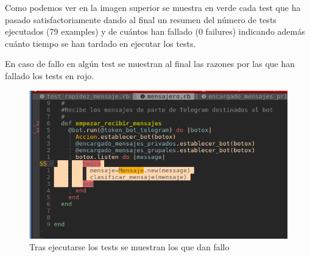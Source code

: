 Como podemos ver en la imagen superior se muestra en verde cada test que ha pasado satisfactoriamente dando al final un resumen del número de tests ejecutados (79 examples) y de cuántos han fallado (0 failures) indicando además cuánto tiempo se han tardado en ejecutar los tests.
\par
En caso de fallo en algún test se muestran al final las razones por las que han fallado los tests en rojo.

\begin{figure}[H] %
\centering
\includegraphics[scale=0.6]{imagenes/random/Screenshot_2017-08-27_11-49-39.png}  %

\caption{Tras ejecutarse los tests se muestran los que dan fallo}\label{figura94}

\end{figure}

